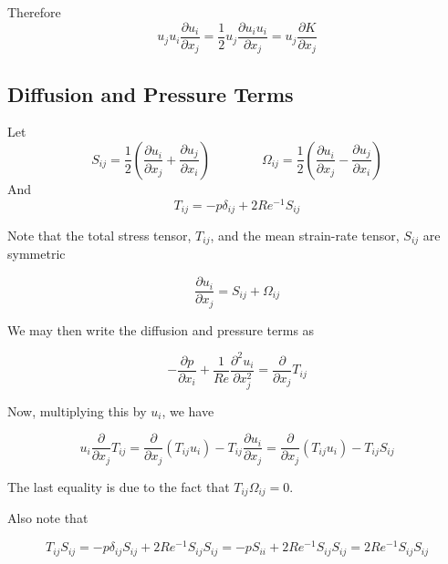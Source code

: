 \documentclass[11pt]{article}
\begin{document}
Therefore
\begin{equation}
	u_j u_i \frac{\partial u_i}{\partial x_j}
	=
	\frac{1}{2} u_j \frac{\partial u_i u_i}{\partial x_j}
	=
	u_j \frac{\partial K}{\partial x_j}
\end{equation}


\subsection{Diffusion and Pressure Terms}
Let
\begin{equation}
	S_{ij} 
	=
	\frac{1}{2}
	\left(
	\frac{\partial u_i}{\partial x_j}
	+
	\frac{\partial u_j}{\partial x_i}
	\right)
	\qquad \qquad
	\Omega_{ij} 
	=
	\frac{1}{2}
	\left(
	\frac{\partial u_i}{\partial x_j}
	-
	\frac{\partial u_j}{\partial x_i}
	\right)
\end{equation}
And
\begin{equation}
	T_{ij}
	=
	-p \delta_{ij}
	+
	2 Re^{-1}
	S_{ij}
\end{equation}

Note that the total stress tensor, $T_{ij}$, and the mean strain-rate tensor, $S_{ij}$ are symmetric

\begin{equation}
	\frac{\partial u_i}{\partial x_j}
	= S_{ij} + \Omega_{ij}
\end{equation}

We may then write the diffusion and pressure terms as

\begin{equation}
	-\frac{\partial p}{\partial x_i}
	+ \frac{1}{Re}
	\frac{\partial^2 u_i}{\partial x_j^2}
	=
	\frac{\partial}{\partial x_j} T_{ij}
\end{equation}

Now, multiplying this by $u_i$, we have

\begin{equation}
	u_i \frac{\partial}{\partial x_j} T_{ij}
	=
	\frac{\partial}{\partial x_j} (T_{ij} u_i)
	-
	T_{ij} \frac{\partial u_i}{\partial x_j}
	=
	\frac{\partial}{\partial x_j} (T_{ij} u_i)
	- T_{ij} S_{ij}
\end{equation}

The last equality is due to the fact that $T_{ij} \Omega_{ij} = 0$.

Also note that

\begin{equation}
	T_{ij} S_{ij}
	=
	-p \delta_{ij} S_{ij}
	+ 2 Re^{-1} S_{ij} S_{ij}
	=
	-p S_{ii}
	+ 2 Re^{-1} S_{ij} S_{ij}
	=
	2 Re^{-1} S_{ij} S_{ij}
\end{equation}
\end{document}
